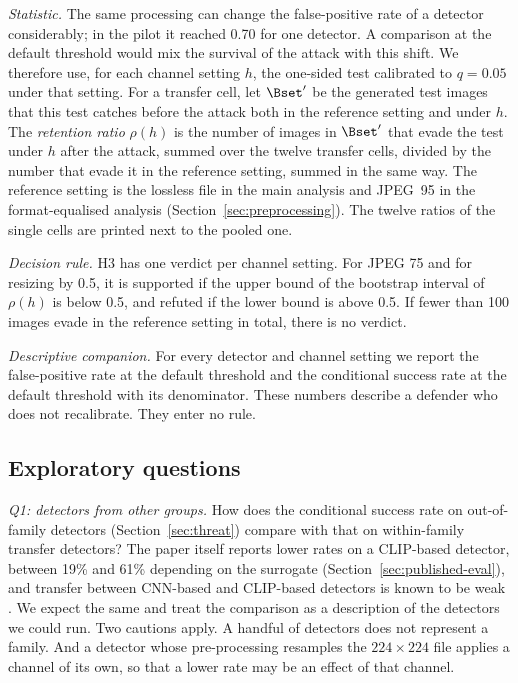 \emph{Statistic.} The same processing can change the false-positive rate of a detector
considerably; in the pilot it reached 0.70 for one detector. A comparison at the default threshold
would mix the survival of the attack with this shift. We therefore use, for each channel setting
$h$, the one-sided test calibrated to $q=0.05$ under that setting. For a transfer cell, let
$\Bset'$ be the generated test images that this test catches before the attack both in the
reference setting and under $h$. The \emph{retention ratio} $\rho(h)$ is the number of images in
$\Bset'$ that evade the test under $h$ after the attack, summed over the twelve transfer cells,
divided by the number that evade it in the reference setting, summed in the same way. The
reference setting is the lossless file in the main analysis and JPEG~95 in the format-equalised
analysis (Section~\ref{sec:preprocessing}). The twelve ratios of the single cells are printed next
to the pooled one.

\emph{Decision rule.} H3 has one verdict per channel setting. For JPEG 75 and for resizing by 0.5,
it is supported if the upper bound of the bootstrap interval of $\rho(h)$ is below 0.5, and
refuted if the lower bound is above 0.5. If fewer than 100 images evade in the reference setting
in total, there is no verdict.

\emph{Descriptive companion.} For every detector and channel setting we report the false-positive
rate at the default threshold and the conditional success rate at the default threshold with its
denominator. These numbers describe a defender who does not recalibrate. They enter no rule.

\subsection{Exploratory questions}
\label{sec:questions}

\emph{Q1: detectors from other groups.} How does the conditional success rate on out-of-family
detectors (Section~\ref{sec:threat}) compare with that on within-family transfer detectors? The
paper itself reports lower rates on a CLIP-based detector, between 19\% and 61\% depending on the
surrogate (Section~\ref{sec:published-eval}), and transfer between CNN-based and CLIP-based
detectors is known to be weak . We expect the same and treat the comparison
as a description of the detectors we could run. Two cautions apply. A handful of detectors does not
represent a family. And a detector whose pre-processing resamples the $224\times224$ file applies a
channel of its own, so that a lower rate may be an effect of that channel.


